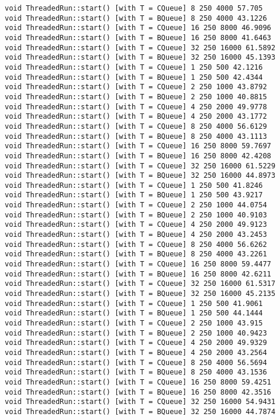 \begin{verbatim}
void ThreadedRun::start() [with T = CQueue] 8 250 4000 57.705
void ThreadedRun::start() [with T = BQueue] 8 250 4000 43.1226
void ThreadedRun::start() [with T = CQueue] 16 250 8000 46.9096
void ThreadedRun::start() [with T = BQueue] 16 250 8000 41.6463
void ThreadedRun::start() [with T = CQueue] 32 250 16000 61.5892
void ThreadedRun::start() [with T = BQueue] 32 250 16000 45.1393
void ThreadedRun::start() [with T = CQueue] 1 250 500 42.1216
void ThreadedRun::start() [with T = BQueue] 1 250 500 42.4344
void ThreadedRun::start() [with T = CQueue] 2 250 1000 43.8792
void ThreadedRun::start() [with T = BQueue] 2 250 1000 40.8815
void ThreadedRun::start() [with T = CQueue] 4 250 2000 49.9778
void ThreadedRun::start() [with T = BQueue] 4 250 2000 43.1772
void ThreadedRun::start() [with T = CQueue] 8 250 4000 56.6129
void ThreadedRun::start() [with T = BQueue] 8 250 4000 43.1113
void ThreadedRun::start() [with T = CQueue] 16 250 8000 59.7697
void ThreadedRun::start() [with T = BQueue] 16 250 8000 42.4208
void ThreadedRun::start() [with T = CQueue] 32 250 16000 61.5229
void ThreadedRun::start() [with T = BQueue] 32 250 16000 44.8973
void ThreadedRun::start() [with T = CQueue] 1 250 500 41.8246
void ThreadedRun::start() [with T = BQueue] 1 250 500 43.9217
void ThreadedRun::start() [with T = CQueue] 2 250 1000 44.0754
void ThreadedRun::start() [with T = BQueue] 2 250 1000 40.9103
void ThreadedRun::start() [with T = CQueue] 4 250 2000 49.9123
void ThreadedRun::start() [with T = BQueue] 4 250 2000 43.2453
void ThreadedRun::start() [with T = CQueue] 8 250 4000 56.6262
void ThreadedRun::start() [with T = BQueue] 8 250 4000 43.2261
void ThreadedRun::start() [with T = CQueue] 16 250 8000 59.4477
void ThreadedRun::start() [with T = BQueue] 16 250 8000 42.6211
void ThreadedRun::start() [with T = CQueue] 32 250 16000 61.5317
void ThreadedRun::start() [with T = BQueue] 32 250 16000 45.2135
void ThreadedRun::start() [with T = CQueue] 1 250 500 41.9061
void ThreadedRun::start() [with T = BQueue] 1 250 500 44.1444
void ThreadedRun::start() [with T = CQueue] 2 250 1000 43.915
void ThreadedRun::start() [with T = BQueue] 2 250 1000 40.9423
void ThreadedRun::start() [with T = CQueue] 4 250 2000 49.9329
void ThreadedRun::start() [with T = BQueue] 4 250 2000 43.2564
void ThreadedRun::start() [with T = CQueue] 8 250 4000 56.5694
void ThreadedRun::start() [with T = BQueue] 8 250 4000 43.1536
void ThreadedRun::start() [with T = CQueue] 16 250 8000 59.4251
void ThreadedRun::start() [with T = BQueue] 16 250 8000 42.3516
void ThreadedRun::start() [with T = CQueue] 32 250 16000 54.9431
void ThreadedRun::start() [with T = BQueue] 32 250 16000 44.7874

\end{verbatim}
